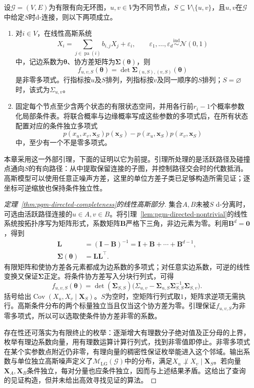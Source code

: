 \begin{lemma}[条件独立约束的非平凡性]
  \label{lem:pgm-directed-nontrivial}
  设$\mathcal{G}=(V,E)$为有限有向无环图，$u,v\in V$为不同节点，$S\subseteq V\setminus\{u,v\}$，且$u,v$在$\mathcal{G}$中给定$S$时d-连接，则以下两项成立。
  \begin{enumerate}
    \item 对$i\in V$，在线性高斯系统
    \[
      X_i=\sum_{j\in\operatorname{pa}(i)}b_{i,j}X_j+\varepsilon_i,
      \qquad
      \varepsilon_1,\ldots,\varepsilon_d
      \mathrel{\overset{\mathrm{ind}}{\sim}}\mathcal N(0,1)
    \]
    中，记边系数为$\bm{\theta}$、协方差矩阵为$\bm{\Sigma}(\bm{\theta})$，则
    \[
      f_{u,v,S}(\bm{\theta})
      =\det\bm{\Sigma}_{(u,S),(v,S)}(\bm{\theta})
    \]
    是非零多项式。行指标按$u$及$S$排列，列指标按$v$及同一顺序的$S$排列；$S=\varnothing$时，该式为$\Sigma_{u,v}$。
    \item 固定每个节点至少含两个状态的有限状态空间，并用各行前$r_i-1$个概率参数化局部条件表。将联合概率与边缘概率写成这些参数的多项式后，在所有状态配置对应的条件独立多项式
    \[
      p(x_u,x_v,\bm{x}_S)p(\bm{x}_S)
      -p(x_u,\bm{x}_S)p(x_v,\bm{x}_S)
    \]
    中，至少有一个不是零多项式。
  \end{enumerate}
\end{lemma}

本章采用这一外部引理，下面的证明以它为前提。引理所处理的是活跃路径及碰撞点通向$S$的有向路径：从中提取保留连接的子图，并控制路径交会时的代数抵消。高斯模型可以使用任意正噪声方差，这里的单位方差子类已足够构造所需见证；逐坐标可逆缩放也保持条件独立性。

\begin{proof}[定理~\ref{thm:pgm-directed-completeness}的线性高斯部分]
集合$A,B$未被$S$ d-分离时，可选由活跃路径连接的$u\in A,v\in B$。将引理~\ref{lem:pgm-directed-nontrivial}的线性系统按拓扑序写为矩阵形式，系数矩阵$\bm{B}$严格下三角，非边元素为零。利用$\bm{B}^d=\bm 0$，得到
\[
  \begin{aligned}
    \bm{L}&=(\bm{I}-\bm{B})^{-1}
       =\bm{I}+\bm{B}+\cdots+\bm{B}^{d-1},\\
    \bm{\Sigma}(\bm{\theta})&=\bm{L}\bm{L}^{\top}.
  \end{aligned}
\]
有限矩阵和使协方差各元素都成为边系数的多项式；对任意实边系数，可逆的线性变换又保证$\bm{\Sigma}$正定。将条件协方差写入分块行列式，可得
\[
  f_{u,v,S}(\bm{\theta})
    =\det(\bm{\Sigma}_{S,S})
      \bigl(\Sigma_{u,v}
        -\bm{\Sigma}_{u,S}\bm{\Sigma}_{S,S}^{-1}
         \bm{\Sigma}_{S,v}\bigr).
\]
括号给出$\operatorname{Cov}(X_u,X_v\mid\bm X_S)$。$S$为空时，空矩阵行列式取$1$，矩阵求逆项无需执行。高斯条件分布的两个标量独立当且仅当这个协方差为零。引理保证$f_{u,v,S}$为非零多项式，所以可以选取使条件协方差非零的系数。

存在性还可落实为有限终止的枚举：逐渐增大有理数分子绝对值及正分母的上界，枚举有理边系数向量，用有理数运算计算行列式，找到非零值即停止。非零多项式在某个实参数点附近仍非零，有理向量的稠密性保证枚举能进入这个邻域。输出系数与单位独立高斯噪声定义了$\mathcal{M}_{\mathrm{LG}}(\mathcal{G})$中的分布，满足$X_u\not\perp X_v\mid\bm X_S$。若向量$\bm X_A,\bm X_B$条件独立，每对分量也应条件独立，因而与上述结果矛盾。这给出了查询的见证构造，但并未给出高效寻找见证的算法。
\end{proof}

